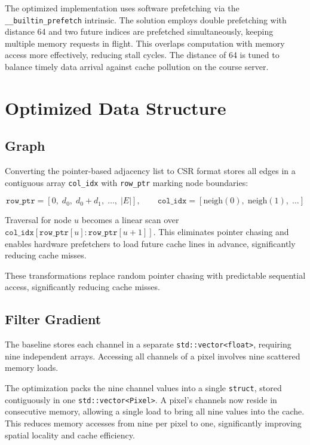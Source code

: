 \documentclass[11pt]{article}
\begin{document}
\noindent The optimized implementation uses software prefetching via the
\texttt{\_\_builtin\_prefetch} intrinsic. The solution employs double prefetching with distance 64 and two future indices are prefetched simultaneously, keeping multiple memory requests in flight. This overlaps computation with memory access more effectively, reducing stall cycles. The distance of 64 is tuned to balance timely data arrival against cache pollution on the course server.

\section{Optimized Data Structure}
\subsection{Graph}

\noindent Converting the pointer-based adjacency list to CSR format stores all edges in a contiguous array \texttt{col\_idx} with \texttt{row\_ptr} marking node boundaries:

\[
\texttt{row\_ptr} = [0,\; d_0,\; d_0+d_1,\; \ldots,\; |E|], \qquad
\texttt{col\_idx} = [\text{neigh}(0),\; \text{neigh}(1),\; \ldots]
\]

\noindent Traversal for node \(u\) becomes a linear scan over \(\texttt{col\_idx}[\texttt{row\_ptr}[u]:\texttt{row\_ptr}[u+1]]\). This eliminates pointer chasing and enables hardware prefetchers to load future cache lines in advance, significantly reducing cache misses.

\vspace{0.3em}

\noindent These transformations replace random pointer chasing with predictable sequential access, significantly reducing cache misses.

\subsection{Filter Gradient}

The baseline stores each channel in a separate \texttt{std::vector<float>}, requiring nine independent arrays. Accessing all channels of a pixel involves nine scattered memory loads.

\vspace{0.3em}

\noindent The optimization packs the nine channel values into a single \texttt{struct}, stored contiguously in one \texttt{std::vector<Pixel>}. A pixel's channels now reside in consecutive memory, allowing a single load to bring all nine values into the cache. This reduces memory accesses from nine per pixel to one, significantly improving spatial locality and cache efficiency.
\end{document}

